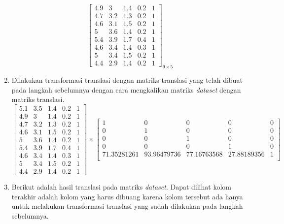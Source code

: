 \begin{enumerate}
\[\begin{bmatrix}
            4.9		&		3		&		1.4		&		0.2		&		1 \\
            4.7		&		3.2		&		1.3		&		0.2		&		1 \\
            4.6		&		3.1		&		1.5		&		0.2		&		1 \\
            5		&		3.6		&		1.4		&		0.2		&		1 \\
            5.4		&		3.9		&		1.7		&		0.4		&		1 \\
            4.6		&		3.4		&		1.4		&		0.3		&		1 \\
            5		&		3.4		&		1.5		&		0.2		&		1 \\
            4.4		&		2.9		&		1.4		&		0.2		&		1
        \end{bmatrix}_{9\times 5}
    \]
    \item Dilakukan transformasi translasi dengan matriks translasi yang telah dibuat pada langkah sebelumnya dengan cara mengkalikan matriks \textit{dataset} dengan matriks translasi.
    \[
        \begin{bmatrix}
            5.1		&		3.5		&		1.4		&		0.2		&		1 \\
            4.9		&		3		&		1.4		&		0.2		&		1 \\
            4.7		&		3.2		&		1.3		&		0.2		&		1 \\
            4.6		&		3.1		&		1.5		&		0.2		&		1 \\
            5		&		3.6		&		1.4		&		0.2		&		1 \\
            5.4		&		3.9		&		1.7		&		0.4		&		1 \\
            4.6		&		3.4		&		1.4		&		0.3		&		1 \\
            5		&		3.4		&		1.5		&		0.2		&		1 \\
            4.4		&		2.9		&		1.4		&		0.2		&		1
        \end{bmatrix} 
        \times
        \begin{bmatrix}
            1				&		0				&		0				&		0				&		0 \\
            0				&		1				&		0				&		0				&		0 \\
            0				&		0				&		1				&		0				&		0 \\
            0				&		0				&		0				&		1				&		0 \\
            71.35281261		&		93.96479736		&		77.16763568		&		27.88189356		&		1 \\
        \end{bmatrix} 
    \]
    \item Berikut adalah hasil translasi pada matriks \textit{dataset}. Dapat dilihat kolom terakhir adalah kolom yang harus dibuang karena kolom tersebut ada hanya untuk melakukan transformasi translasi yang sudah dilakukan pada langkah sebelumnya.

\end{enumerate}
